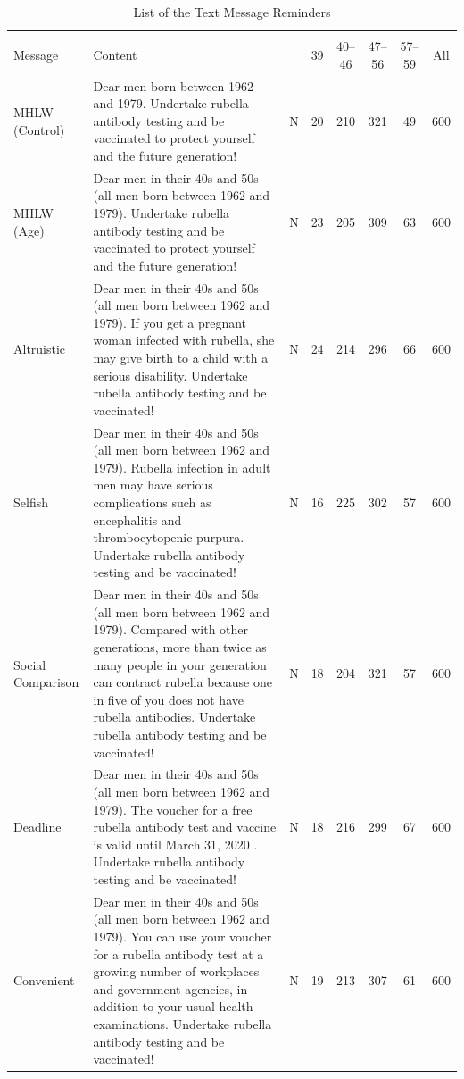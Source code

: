 \documentclass[
]{article}
\begin{document}
\begin{table}

\caption{\label{tab:message-list}List of the Text Message Reminders}
\centering
\fontsize{9}{11}\selectfont
\begin{tabular}[t]{l>{\raggedright\arraybackslash}p{20em}cccccc}
\toprule
\multicolumn{3}{c}{ } & \multicolumn{4}{c}{Age (as of April 2019)} & \multicolumn{1}{c}{ } \\
\cmidrule(l{3pt}r{3pt}){4-7}
Message & Content &   & 39 & 40--46 & 47--56 & 57--59 & All\\
\midrule
MHLW (Control) & Dear men born between 1962 and 1979. Undertake rubella antibody testing and be vaccinated to protect yourself and the future generation! & N & 20 & 210 & 321 & 49 & 600\\
\addlinespace
MHLW (Age) & Dear men in their 40s and 50s (all men born between 1962 and 1979). Undertake rubella antibody testing and be vaccinated to protect yourself and the future generation! & N & 23 & 205 & 309 & 63 & 600\\
\addlinespace
Altruistic & Dear men in their 40s and 50s (all men born between 1962 and 1979). If you get a pregnant woman infected with rubella, she may give birth to a child with a serious disability. Undertake rubella antibody testing and be vaccinated! & N & 24 & 214 & 296 & 66 & 600\\
\addlinespace
Selfish & Dear men in their 40s and 50s (all men born between 1962 and 1979). Rubella infection in adult men may have serious complications such as encephalitis and thrombocytopenic purpura. Undertake rubella antibody testing and be vaccinated! & N & 16 & 225 & 302 & 57 & 600\\
\addlinespace
Social Comparison & Dear men in their 40s and 50s (all men born between 1962 and 1979). Compared with other generations, more than twice as many people in your generation can contract rubella because one in five of you does not have rubella antibodies. Undertake rubella antibody testing and be vaccinated! & N & 18 & 204 & 321 & 57 & 600\\
\addlinespace
Deadline & Dear men in their 40s and 50s (all men born between 1962 and 1979). The voucher for a free rubella antibody test and vaccine is valid until March 31, 2020 . Undertake rubella antibody testing and be vaccinated! & N & 18 & 216 & 299 & 67 & 600\\
\addlinespace
Convenient & Dear men in their 40s and 50s (all men born between 1962 and 1979). You can use your voucher for a rubella antibody test at a growing number of workplaces and government agencies, in addition to your usual health examinations. Undertake rubella antibody testing and be vaccinated! & N & 19 & 213 & 307 & 61 & 600\\
\bottomrule
\end{tabular}
\end{table}
\end{document}
